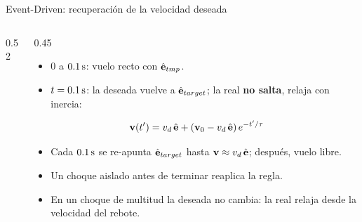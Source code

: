 \begin{frame}{Event-Driven: recuperación de la velocidad deseada}
  \begin{columns}[c]
    \begin{column}{0.52\textwidth}
      \centering
    \end{column}
    \begin{column}{0.45\textwidth}
      \small
      \begin{itemize}
        \item $0$ a $0.1\,\mathrm{s}$: vuelo recto con $\hat{\mathbf{e}}_{tmp}$.
        \item $t = 0.1\,\mathrm{s}$: la deseada vuelve a $\hat{\mathbf{e}}_{target}$; la real \textbf{no salta}, relaja con
          inercia:
      \end{itemize}
      \[
        \mathbf{v}(t') = v_d\,\hat{\mathbf{e}} + (\mathbf{v}_0 - v_d\,\hat{\mathbf{e}})\,e^{-t'/\tau}
      \]
      \begin{itemize}
        \item Cada $0.1\,\mathrm{s}$ se re-apunta $\hat{\mathbf{e}}_{target}$ hasta $\mathbf{v} \approx v_d\,\hat{\mathbf{e}}$; después, vuelo libre.
        \item Un choque aislado antes de terminar reaplica la regla.
        \item En un choque de multitud la deseada no cambia: la real relaja desde la velocidad del rebote.
      \end{itemize}
    \end{column}
  \end{columns}
\end{frame}

